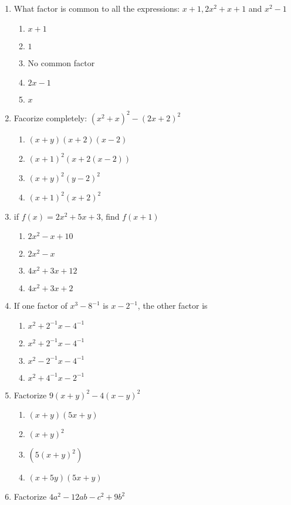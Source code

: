 \begin{multicols}{2}
\begin{enumerate}[label={\arabic*.}]
\begin{enumerate}[label={\Alph*.}]
	\end{enumerate}
\item What factor is common to all the expressions: \(x+1, 2x^2+x+1\) and \(x^2-1\)
	\begin{enumerate}[label={\Alph*.}]
	\item \(x+1\)
	\item \(1\)
	\item No common factor
	\item \(2x-1\)
	\item \(x\)
	\end{enumerate}
\item Facorize completely: \((x^2+x)^2-(2x+2)^2\)
	\begin{enumerate}[label={\Alph*.}]
	\item \((x+y)(x+2)(x-2)\)
	\item \((x+1)^2(x+2(x-2))\)
	\item \((x+y)^2(y-2)^2\)
	\item \((x+1)^2(x+2)^2\)
	\end{enumerate}
\item if \(f(x) = 2x^2+5x+3\), find \(f(x+1)\)
	\begin{enumerate}[label={\Alph*.}]
	\item \(2x^2-x+10\)
	\item \(2x^2-x\)
	\item \(4x^2+3x+12\)
	\item \(4x^2+3x+2\)
	\end{enumerate}
\item If one factor of \(x^3-8^{-1}\) is \(x-2^{-1}\), the other factor is
	\begin{enumerate}[label={\Alph*.}]
	\item \(x^2+2^{-1}x-4^{-1}\)
	\item \(x^2+2^{-1}x-4^{-1}\)
	\item \(x^2-2^{-1}x-4^{-1}\)
	\item \(x^2+4^{-1}x-2^{-1}\)
	\end{enumerate}
\item Factorize \(9(x+y)^2 - 4(x-y)^2\)
	\begin{enumerate}[label={\Alph*.}]
	\item \((x+y)(5x+y)\)
	\item \((x+y)^2\)
	\item \((5(x+y)^2)\)
	\item \((x+5y)(5x+y)\)
	\end{enumerate}
\item Factorize \(4a^2-12ab-c^2+9b^2\)

\end{enumerate}
\end{multicols}

